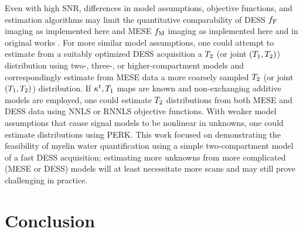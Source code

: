 Even with high SNR,
differences in model assumptions, objective functions, and estimation algorithms
may limit the quantitative comparability 
of DESS $f_{\mathrm{F}}$ imaging as implemented here
and MESE $f_\mathrm{M}$ imaging as implemented here and in original works 
\cite{mackay:94:ivv,whittall:89:qio}.
For more similar model assumptions,
one could attempt to estimate 
from a suitably optimized DESS acquisition
a $T_2$ (or joint $\paren{\To,\Tt}$) distribution
using two-, three-, or higher-compartment models
and correspondingly estimate from MESE data
a more coarsely sampled 
$T_2$ (or joint $\paren{\To,\Tt}$) distribution.
If $\kappa^{\mathrm{t}},T_1$ maps are known
and non-exchanging additive models are employed,
one could estimate $T_2$ distributions
from both MESE and DESS data 
using NNLS or RNNLS objective functions.
With weaker model assumptions 
that cause signal models to be nonlinear in unknowns,
one could estimate distributions using PERK.
This work focused on demonstrating the feasibility
of myelin water quantification
using a simple two-compartment model 
of a fast DESS acquisition;
estimating more unknowns 
from more complicated (MESE or DESS) models
will at least necessitate more scans
and may still prove challenging in practice.


\section{Conclusion}
\label{s,mwf,conc}

